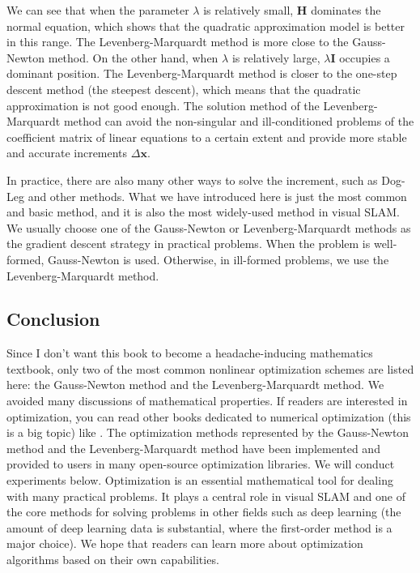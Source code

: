 We can see that when the parameter $\lambda$ is relatively small, $\mathbf{H}$ dominates the normal equation, which shows that the quadratic approximation model is better in this range. The Levenberg-Marquardt method is more close to the Gauss-Newton method. On the other hand, when $\lambda$ is relatively large, $\lambda \mathbf{I}$ occupies a dominant position. The Levenberg-Marquardt method is closer to the one-step descent method (the steepest descent), which means that the quadratic approximation is not good enough. The solution method of the Levenberg-Marquardt method can avoid the non-singular and ill-conditioned problems of the coefficient matrix of linear equations to a certain extent and provide more stable and accurate increments $\Delta \mathbf{x} $.

In practice, there are also many other ways to solve the increment, such as Dog-Leg \cite{Nocedal2006} and other methods. What we have introduced here is just the most common and basic method, and it is also the most widely-used method in visual SLAM. We usually choose one of the Gauss-Newton or Levenberg-Marquardt methods as the gradient descent strategy in practical problems. When the problem is well-formed, Gauss-Newton is used. Otherwise, in ill-formed problems, we use the Levenberg-Marquardt method.

\subsection{Conclusion}
Since I don't want this book to become a headache-inducing mathematics textbook, only two of the most common nonlinear optimization schemes are listed here: the Gauss-Newton method and the Levenberg-Marquardt method. We avoided many discussions of mathematical properties. If readers are interested in optimization, you can read other books dedicated to numerical optimization (this is a big topic) like \cite{Nocedal2006}. The optimization methods represented by the Gauss-Newton method and the Levenberg-Marquardt method have been implemented and provided to users in many open-source optimization libraries. We will conduct experiments below. Optimization is an essential mathematical tool for dealing with many practical problems. It plays a central role in visual SLAM and one of the core methods for solving problems in other fields such as deep learning (the amount of deep learning data is substantial, where the first-order method is a major choice). We hope that readers can learn more about optimization algorithms based on their own capabilities.

